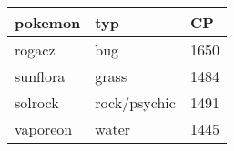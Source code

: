 \begin{table}[htbp]
\begin{tabular}{|l|l|l|}
\hline
\textbf{pokemon} & \textbf{typ} & \textbf{CP} \\ \hline
rogacz           & bug          & 1650        \\ \hline
sunflora         & grass        & 1484        \\ \hline
solrock          & rock/psychic & 1491        \\ \hline
vaporeon         & water        & 1445        \\ \hline
\end{tabular}
\end{table}